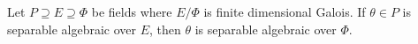 Let $P \supseteq E \supseteq \Phi$ be fields where $E/\Phi$ is finite dimensional Galois. If $\theta \in P$ is separable algebraic over $E$, then $\theta$ is separable algebraic over $\Phi$.
